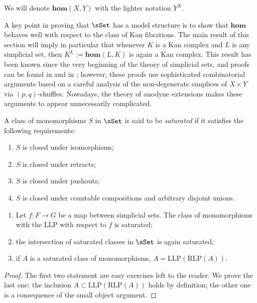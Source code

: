 \begin{refsection}
\begin{notation}
We will denote $\mathbf{hom}(X,Y)$ with the lighter notation $Y^X$.
\end{notation}

A key point in proving that $\sSet$ has a model structure is to show that $\mathbf{hom}$ behaves well with respect to the class of Kan fibrations. The main result of this section will imply in particular that whenever $K$ is a Kan complex and $L$ is any simplicial set, then $K^L := \mathbf{hom}(L,K)$ is again a Kan complex. This result has been known since the very beginning of the theory of simplicial sets, and proofs can be found in \cite{gz} and in \cite{may}; however, these proofs use sophisticated combinatorial arguments based on a careful analysis of the non-degenerate simplices of $X \times Y$ via $(p,q)$-shuffles. Nowadays, the theory of anodyne extensions makes these arguments to appear unnecessarily complicated.

\begin{defin}
A class of monomorphisms $S$ in $\sSet$ is said to be \emph{saturated} if it satisfies the following requirements:
\begin{enumerate}
\item $S$ is closed under isomorphisms;
\item $S$ is closed under retracts;
\item $S$ is closed under pushouts;
\item $S$ is closed under countable compositions and arbitrary disjoint unions.
\end{enumerate}
\end{defin}

\begin{lemma} \label{lemma llp saturation}
\begin{enumerate}
\item Let $f \colon F \to G$ be a map between simplicial sets. The class of monomorphisms with the LLP with respect to $f$ is saturated;

\item the intersection of saturated classes in $\sSet$ is again saturated;

\item if $A$ is a saturated class of monomorphisms, $A = \mathrm{LLP}(\mathrm{RLP}(A))$.
\end{enumerate}
\end{lemma}

\begin{proof}
The first two statement are easy exercises left to the reader. We prove the last one: the inclusion $A \subset \mathrm{LLP}(\mathrm{RLP}(A))$ holds by definition; the other one is a consequence of the small object argument.
\end{proof}


\end{refsection}
